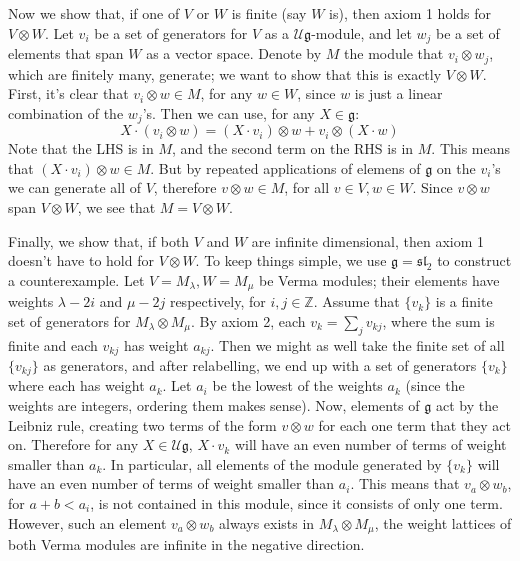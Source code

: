 \documentclass[12 pt]{article}
\newcommand{\Z}{\mathbb{Z}}
\newcommand{\fr}{\mathfrak}
\begin{document}
Now we show that, if one of $V$ or $W$ is finite (say $W$ is), then axiom 1 holds for $V \otimes W$. Let $v_i$ be a set of generators for $V$ as a $\mathcal{U}\fr{g}$-module, and let $w_j$ be a set of elements that span $W$ as a vector space. Denote by $M$ the module that $v_i \otimes w_j$, which are finitely many, generate; we want to show that this is exactly $V \otimes W$. First, it's clear that $v_i \otimes w \in M$, for any $w \in W$, since $w$ is just a linear combination of the $w_j$'s. Then we can use, for any $X \in \fr g$:
\[      X \cdot (v_i \otimes w) = (X \cdot v_i) \otimes w + v_i \otimes (X \cdot w)    \]
Note that the LHS is in $M$, and the second term on the RHS is in $M$. This means that $(X \cdot v_i) \otimes w \in M$. But by repeated applications of elemens of $\fr g$ on the $v_i$'s we can generate all of $V$, therefore $v\otimes w \in M$, for all $v \in V, w\in W$. Since $v\otimes w$ span $V \otimes W$, we see that $M = V \otimes W$.

Finally, we show that, if both $V$ and $W$ are infinite dimensional, then axiom 1 doesn't have to hold for $V \otimes W$. To keep things simple, we use $\fr g = \fr{sl}_2$ to construct a counterexample. Let $V = M_{\lambda}, W = M_{\mu}$ be Verma modules; their elements have weights $\lambda - 2i$ and $\mu - 2j$ respectively, for $i,j\in \Z$. Assume that $\{v_k\}$ is a finite set of generators for $M_{\lambda} \otimes M_{\mu}$. By axiom 2, each $v_k = \sum_j v_{kj}$, where the sum is finite and each $v_{kj}$ has weight $a_{kj}$. Then we might as well take the finite set of all $\{v_{kj}\}$ as generators, and after relabelling, we end up with a set of generators $\{v_k\}$ where each has weight $a_k$. Let $a_i$ be the lowest of the weights $a_k$ (since the weights are integers, ordering them makes sense). Now, elements of $\fr g$ act by the Leibniz rule, creating two terms of the form $v \otimes w$ for each one term that they act on. Therefore for any $X \in \mathcal{U}\fr g$, $X \cdot v_k$ will have an even number of terms of weight smaller than $a_k$. In particular, all elements of the module generated by $\{v_k\}$ will have an even number of terms of weight smaller than $a_i$. This means that $v_a \otimes w_b$, for $a+b < a_i$, is not contained in this module, since it consists of only one term. However, such an element $v_a \otimes w_b$ always exists in $M_{\lambda} \otimes M_{\mu}$, the weight lattices of both Verma modules are infinite in the negative direction.
\end{document}

